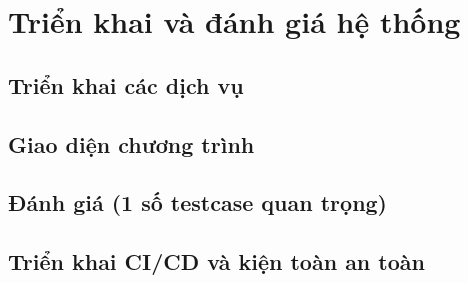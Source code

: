
\newpage
\section{Triển khai và đánh giá hệ thống}

\lipsum[1]


\subsection{Triển khai các dịch vụ}


\lipsum[1]


\subsection{Giao diện chương trình}


\lipsum[1]


\subsection{Đánh giá (1 số testcase quan trọng)}


\lipsum[1]


\subsection{Triển khai CI/CD và kiện toàn an toàn}


\lipsum[1]
